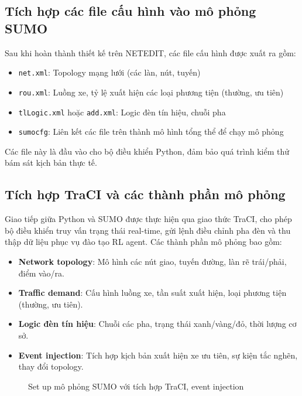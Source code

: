 \subsection{Tích hợp các file cấu hình vào mô phỏng SUMO}

Sau khi hoàn thành thiết kế trên NETEDIT, các file cấu hình được xuất ra gồm:
\begin{itemize}
    \item \texttt{net.xml}: Topology mạng lưới (các làn, nút, tuyến)
    \item \texttt{rou.xml}: Luồng xe, tỷ lệ xuất hiện các loại phương tiện (thường, ưu tiên)
    \item \texttt{tlLogic.xml} hoặc \texttt{add.xml}: Logic đèn tín hiệu, chuỗi pha
    \item \texttt{sumocfg}: Liên kết các file trên thành mô hình tổng thể để chạy mô phỏng
\end{itemize}
Các file này là đầu vào cho bộ điều khiển Python, đảm bảo quá trình kiểm thử bám sát kịch bản thực tế.
\subsection{Tích hợp TraCI và các thành phần mô phỏng}

Giao tiếp giữa Python và SUMO được thực hiện qua giao thức TraCI, cho phép bộ điều khiển truy vấn trạng thái real-time, gửi lệnh điều chỉnh pha đèn và thu thập dữ liệu phục vụ đào tạo RL agent. Các thành phần mô phỏng bao gồm:

\begin{itemize}
    \item \textbf{Network topology}: Mô hình các nút giao, tuyến đường, làn rẽ trái/phải, điểm vào/ra.
    \item \textbf{Traffic demand}: Cấu hình luồng xe, tần suất xuất hiện, loại phương tiện (thường, ưu tiên).
    \item \textbf{Logic đèn tín hiệu}: Chuỗi các pha, trạng thái xanh/vàng/đỏ, thời lượng cơ sở.
    \item \textbf{Event injection}: Tích hợp kịch bản xuất hiện xe ưu tiên, sự kiện tắc nghẽn, thay đổi topology.
\end{itemize}

\begin{figure}[H]
    \centering
    \caption{Set up mô phỏng SUMO với tích hợp TraCI, event injection}
    \label{fig:sumo_setup_traci}
\end{figure}

